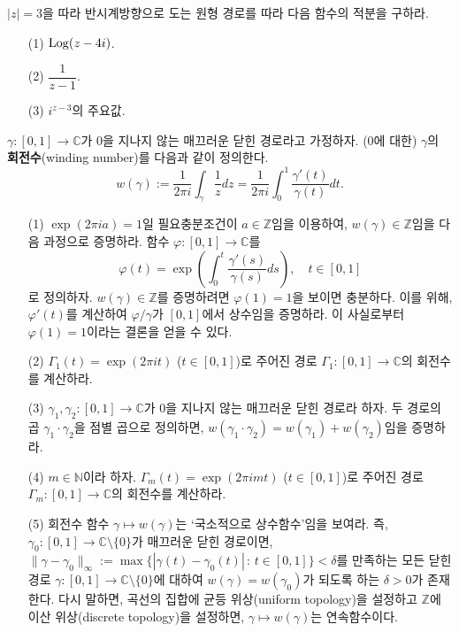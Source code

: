 \begin{salt_exercise} \label{ex-3-20}
$|z|=3$을 따라 반시계방향으로 도는 원형 경로를 따라 다음 함수의 적분을 구하라.
\begin{itemize}
\item[(1)] $\mathop{\mathrm{Log}} (z-4i)$.
\item[(2)] $\dfrac1{z-1}$.
\item[(3)] $i^{z-3}$의 주요값.
\end{itemize}
\end{salt_exercise}

\begin{salt_exercise} \label{ex-3-21}
$\gamma:[0,1]\to\mathbb C$가 $0$을 지나지 않는
매끄러운 닫힌 경로라고 가정하자. ($0$에 대한) $\gamma$의 
{\bf 회전수}(winding number)를 
다음과 같이 정의한다.
\[
w(\gamma) := \dfrac1{2\pi i}\int_\gamma \dfrac 1z dz
= \dfrac1{2\pi i}\int_0^1 \dfrac{\gamma'(t)}{\gamma(t)}dt.
\]
\begin{itemize}
\item[(1)] $\exp(2\pi ia)=1$일 필요충분조건이 $a\in\mathbb Z$임을 이용하여,
$w(\gamma)\in\mathbb Z$임을 다음 과정으로 증명하라.
함수 $\varphi:[0,1] \to\mathbb C$를 
\[
\varphi(t) = \exp\left( \int_0^t \dfrac{\gamma'(s)}{\gamma(s)}ds\right),
\quad t\in[0,1]
\]
로 정의하자.  $w(\gamma)\in\mathbb Z$를 증명하려면
$\varphi(1)=1$을 보이면 충분하다.
이를 위해, $\varphi'(t)$를 계산하여 $\varphi/\gamma$가 $[0,1]$에서 상수임을 증명하라.
이 사실로부터 $\varphi(1)=1$이라는 결론을 얻을 수 있다.
\item[(2)] $\Gamma_1(t)=\exp(2\pi it)$ ($t\in[0,1]$)로 주어진 경로 $\Gamma_1:[0,1]\to\mathbb C$의
회전수를 계산하라.
\item[(3)] $\gamma_1, \gamma_2:[0,1]\to\mathbb C$가 $0$을 지나지 않는
매끄러운 닫힌 경로라 하자. 두 경로의 곱 $\gamma_1\cdot\gamma_2$을
점별 곱으로 정의하면, $w(\gamma_1\cdot\gamma_2) = w(\gamma_1)+w(\gamma_2)$임을
증명하라.
\item[(4)] $m\in \mathbb N$이라 하자. 
$\Gamma_m(t)=\exp(2\pi imt)$ ($t\in[0,1]$)로 주어진 경로 $\Gamma_m:[0,1]\to\mathbb C$의
회전수를 계산하라.
\item[(5)] 회전수 함수 $\gamma \mapsto w(\gamma)$는
`국소적으로 상수함수'임을 보여라.
즉, $\gamma_0:[0,1]\to\mathbb C\setminus\{0\}$가 매끄러운 닫힌 경로이면,
$\|\gamma -\gamma_0\|_\infty := \max\{ |\gamma(t) - \gamma_0(t)| \,:\, t\in[0,1]\}<\delta$를
만족하는 모든 닫힌 경로 $\gamma:[0,1]\to\mathbb C\setminus\{0\}$에 대하여
$w(\gamma) = w(\gamma_0)$가 되도록 하는 $\delta>0$가 존재한다.
다시 말하면, 곡선의 집합에 균등 위상(uniform topology)을 설정하고
$\mathbb Z$에 이산 위상(discrete topology)을  설정하면,
$\gamma \mapsto w(\gamma)$는 연속함수이다.
\end{itemize}
\end{salt_exercise}

